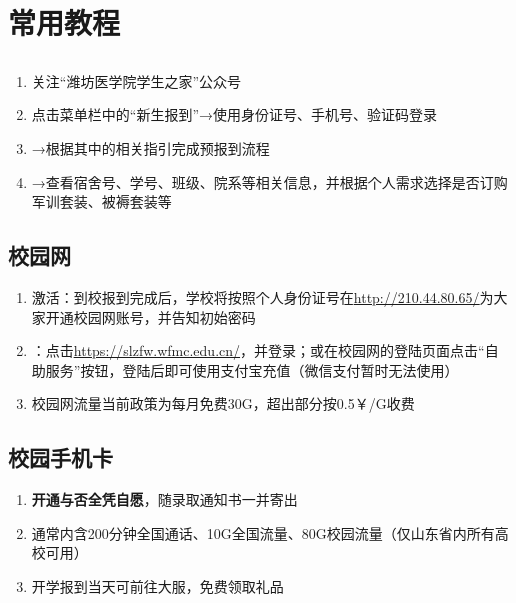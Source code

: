 \chapter[常用教程]{常用教程\vspace{-1em}}

\section[新生信息查询]{}
\label{freshman_query}
\begin{enumerate}
    \item 关注“潍坊医学院学生之家”公众号
    \item 点击菜单栏中的“新生报到”→使用身份证号、手机号、验证码登录
    \item →根据其中的相关指引完成预报到流程
    \item →查看宿舍号、学号、班级、院系等相关信息，并根据个人需求选择是否订购军训套装、被褥套装等\footnotemark
\end{enumerate}

\section[校园网]{校园网\footnotemark}
\begin{enumerate}
    \item 激活：到校报到完成后，学校将按照个人身份证号在\uline{\href{http://210.44.80.65/}{http://210.44.80.65/}}为大家开通校园网账号，并告知初始密码\footnotemark
    \item \textbf{}：点击\uline{\href{https://slzfw.wfmc.edu.cn/}{https://slzfw.wfmc.edu.cn/}}，并登录；或在校园网的登陆页面点击“自助服务”按钮\footnotemark，登陆后即可使用支付宝充值（微信支付暂时无法使用）
    \item 校园网流量当前政策为每月免费30G，超出部分按0.5\textsf{￥}/G收费
\end{enumerate}

\section[校园手机卡]{校园手机卡}
\begin{enumerate}
    \item \textbf{开通与否全凭自愿}，随录取通知书一并寄出
    \item 通常内含200分钟全国通话、10G全国流量、80G校园流量（仅山东省内所有高校可用）\footnotemark
    \item 开学报到当天可前往大服，免费领取礼品
\end{enumerate}

